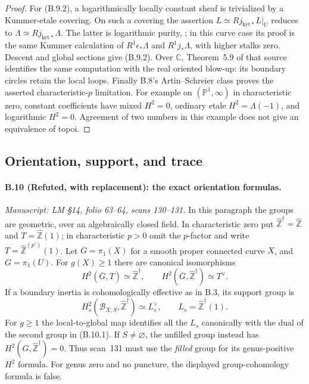 \begin{proof}
For (B.9.2), a logarithmically locally constant sheaf is
trivialized by a Kummer-etale covering. On such a covering
the assertion $L\simeq Rj_{\mathrm{ket}*}L|_U$ reduces to
$\Lambda\simeq Rj_{\mathrm{ket}*}\Lambda$. The latter is
logarithmic purity, \citet[Theorem~7.4]{Illusie2002}; in this
curve case its proof is the same Kummer calculation of
$R^1\epsilon_*\Lambda$ and $R^1j_*\Lambda$, with higher
stalks zero. Descent and global sections give (B.9.2).
Over $\mathbb C$, Theorem~5.9 of that source identifies the
same computation with the real oriented blow-up: its
boundary circles retain the local loops. Finally B.8's
Artin--Schreier class proves the asserted characteristic-$p$
limitation. For example on $(\mathbb P^1,\infty)$ in
characteristic zero, constant coefficients have mixed
$H^2=0$, ordinary etale $H^2=\Lambda(-1)$, and logarithmic
$H^2=0$. Agreement of two numbers in this example does not
give an equivalence of topoi.
\end{proof}

\subsection{Orientation, support, and trace}

\paragraph{B.10 (Refuted, with replacement): the exact orientation formulas.}\label{B10}
\textit{Manuscript: LM \S14, folio 63--64, scans 130--131.}
In this paragraph the groups are geometric, over an
algebraically closed field. In characteristic zero put
$\widehat{\mathbb Z}^{\dagger}=\widehat{\mathbb Z}$ and
$T=\widehat{\mathbb Z}(1)$; in characteristic $p>0$ omit the
$p$-factor and write $T=\widehat{\mathbb Z}^{(p')}(1)$.
Let $\overline G=\pi_1(X)$ for a smooth proper connected
curve $X$, and $G=\pi_1(U)$. For $g(X)\geq1$ there are
canonical isomorphisms
\[
 H^2(\overline G,T)\simeq\widehat{\mathbb Z}^{\dagger},
 \qquad H^2(\overline G,\widehat{\mathbb Z}^{\dagger})
                         \simeq T^\vee.                    \tag{B.10.1}
\]
If a boundary inertia is cohomologically effective as in
B.3, its support group is
\[
 H^2_s(\mathcal B_{X;S},\widehat{\mathbb Z}^{\dagger})
       \simeq L_s^\vee,\qquad
       L_s=\widehat{\mathbb Z}^{\dagger}(1).                \tag{B.10.2}
\]
For $g\geq1$ the local-to-global map identifies all the
$L_s$ canonically with the dual of the second group in
(B.10.1). If $S\ne\varnothing$, the unfilled group instead
has
$H^2(G,\widehat{\mathbb Z}^{\dagger})=0$.
Thus scan~131 must use the \emph{filled} group for its
genus-positive $H^2$ formula. For genus zero and no puncture,
the displayed group-cohomology formula is false.

